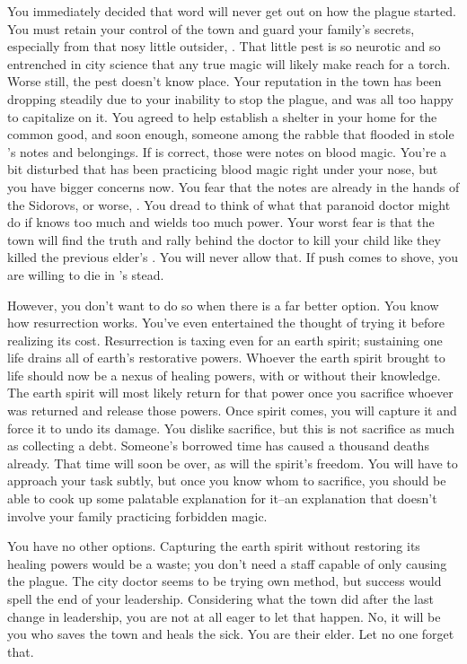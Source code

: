 \documentclass[char]{Pestilence}
\begin{document}
You immediately decided that word will never get out on how the plague started. You must retain your control of the town and guard your family's secrets, especially from that nosy little outsider, \cOutsider{}. That little pest is so neurotic and so entrenched in \cOutsider{\their} city science that any true magic will likely make \cOutsider{\them} reach for a torch. Worse still, the pest doesn't know \cOutsider{\their} place. Your reputation in the town has been dropping steadily due to your inability to stop the plague, and \cOutsider{} was all too happy to capitalize on it. You agreed to help \cOutsider{\them} establish a shelter in your home for the common good, and soon enough, someone among the rabble that flooded in stole \cRebel{}'s notes and belongings. If \cApprentice{} is correct, those were notes on blood magic. You're a bit disturbed that \cRebel{} has been practicing blood magic right under your nose, but you have bigger concerns now. You fear that the notes are already in the hands of the Sidorovs, or worse, \cOutsider{}. You dread to think of what that paranoid doctor might do if \cOutsider{\they} knows too much and wields too much power. Your worst fear is that the town will find the truth and rally behind the doctor to kill your child like they killed the previous elder's \cPlaguebearer{\offspring}. You will never allow that. If push comes to shove, you are willing to die in \cRebel{}'s stead. 

However, you don't want to do so when there is a far better option. You know how resurrection works. You've even entertained the thought of trying it before realizing its cost. Resurrection is taxing even for an earth spirit; sustaining one life drains all of earth's restorative powers. Whoever the earth spirit brought to life should now be a nexus of healing powers, with or without their knowledge. The earth spirit will most likely return for that power once you sacrifice whoever was returned and release those powers. Once spirit comes, you will capture it and force it to undo its damage. You dislike sacrifice, but this is not sacrifice as much as collecting a debt. Someone's borrowed time has caused a thousand deaths already. That time will soon be over, as will the spirit's freedom. You will have to approach your task subtly, but once you know whom to sacrifice, you should be able to cook up some palatable explanation for it--an explanation that doesn't involve your family practicing forbidden magic.

You have no other options. Capturing the earth spirit without restoring its healing powers would be a waste; you don't need a staff capable of only causing the plague. The city doctor seems to be trying \cOutsider{\their} own method, but \cOutsider{\their} success would spell the end of your leadership. Considering what the town did after the last change in leadership, you are not at all eager to let that happen. No, it will be you who saves the town and heals the sick. You are their elder. Let no one forget that.
\end{document}
